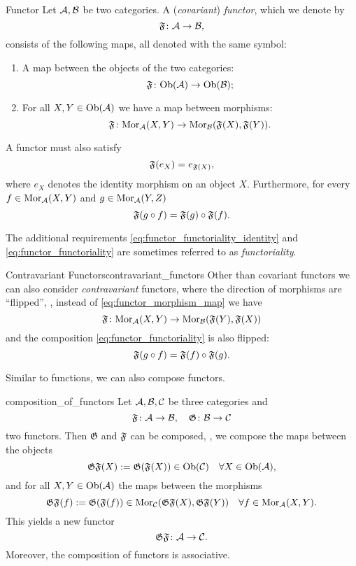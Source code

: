 \begin{definition}{Functor \cite[Sec.~1.3]{Roman2017}}{}
Let $\mathcal{A}, \mathcal{B}$ be two categories. A (\emph{covariant}) \emph{functor}, which we denote by
$$
\mathfrak{F}\colon \mathcal{A} \to \mathcal{B},
$$
consists of the following maps, all denoted with the same symbol:
\begin{enumerate}
    \item A map between the objects of the two categories:
    \begin{equation*}
    \mathfrak{F}\colon \mathrm {Ob}(\mathcal{A}) \to \mathrm {Ob}(\mathcal{B});
    \end{equation*}
    \item For all $X,Y \in \mathrm {Ob}(\mathcal{A})$ we have a map between morphisms: 
    \begin{equation}
    \label{eq:functor_morphism_map}
    \mathfrak{F}\colon \mathrm {Mor}_{\mathcal{A}}(X,Y) \to \mathrm {Mor}_{\mathcal{B}}(\mathfrak{F}(X), \mathfrak{F}(Y)).
    \end{equation}
\end{enumerate}
A functor must also satisfy
\begin{equation}
\label{eq:functor_functoriality_identity}
\mathfrak{F}(e_X) = e_{\mathfrak{F}(X)},
\end{equation}
where $e_X$ denotes the identity morphism on an object $X$. Furthermore, for every ${f \in \mathrm {Mor}_{\mathcal{A}}(X,Y)}$ and $g \in \mathrm {Mor}_{\mathcal{A}}(Y,Z)$
\begin{equation}
\label{eq:functor_functoriality}
\mathfrak{F}(g \circ f) = \mathfrak{F}(g) \circ \mathfrak{F}(f).
\end{equation}
\end{definition}

The additional requirements \eqref{eq:functor_functoriality_identity} and \eqref{eq:functor_functoriality} are sometimes referred to as \emph{functoriality}.

\begin{myremark}{Contravariant Functors}{contravariant_functors}
Other than covariant functors we can also consider \emph{contravariant} functors, where the direction of morphisms are ``flipped'', \ie, instead of \eqref{eq:functor_morphism_map} we have
$$
\mathfrak{F}\colon \mathrm {Mor}_{\mathcal{A}}(X,Y) \to \mathrm {Mor}_{\mathcal{B}}(\mathfrak{F}(Y), \mathfrak{F}(X))
$$
and the composition \eqref{eq:functor_functoriality} is also flipped:
$$
\mathfrak{F}(g \circ f) = \mathfrak{F}(f) \circ \mathfrak{F}(g).
$$
\end{myremark}


Similar to functions, we can also compose functors.

\begin{defprop}{\cite[Sec.~1.3.1]{Roman2017}}{composition_of_functors}
Let $\mathcal{A}, \mathcal{B}, \mathcal{C}$ be three categories and
$$
\mathfrak{F}\colon \mathcal{A} \to \mathcal{B}, \quad \mathfrak{G}\colon \mathcal{B} \to \mathcal{C}
$$
two functors. Then $\mathfrak{G}$ and $\mathfrak{F}$ can be composed, \ie, we compose the maps between the objects 
$$
\mathfrak{G} \mathfrak{F} (X) := \mathfrak{G}(\mathfrak{F}(X)) \in \mathrm {Ob}(\mathcal{C}) \quad \forall X \in \mathrm {Ob}(\mathcal{A}),
$$
and for all $X,Y \in \mathrm {Ob}(\mathcal{A})$ the maps between the morphisms
$$
\mathfrak{G} \mathfrak{F} (f) := \mathfrak{G}(\mathfrak{F}(f)) \in \mathrm {Mor}_{\mathcal{C}}(\mathfrak{G} \mathfrak{F} (X), \mathfrak{G} \mathfrak{F} (Y)) \quad \forall f \in \mathrm {Mor}_{\mathcal{A}}(X,Y).
$$
This yields a new functor
$$
\mathfrak{G} \mathfrak{F}\colon \mathcal{A} \to \mathcal{C}.
$$
Moreover, the composition of functors is associative.
\end{defprop}

